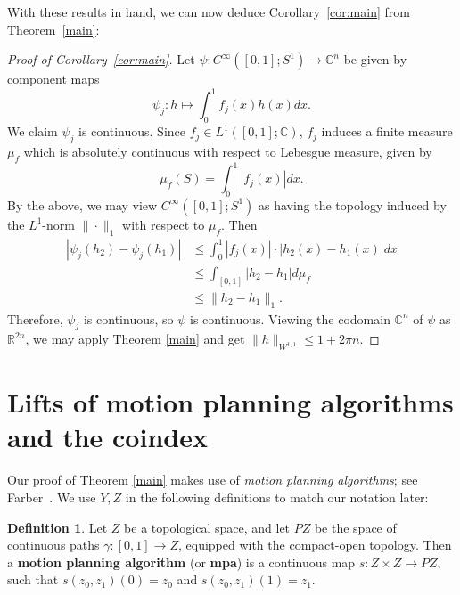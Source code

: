 \documentclass[11pt, reqno, english]{amsart}
\theoremstyle{plain}
\theoremstyle{definition}
\newtheorem{definition}[theorem]{Definition}
\newcommand{\R}{\mathbb{R}}
\newcommand{\C}{\mathbb{C}}
\begin{document}
With these results in hand, we can now deduce Corollary~\ref{cor:main} from Theorem~\ref{main}:

\begin{proof}[Proof of Corollary~\ref{cor:main}]
  Let $\psi\colon C^{\infty}([0, 1]; S^{1}) \rightarrow \C^{n}$ be given by
  component maps $$\psi_{j}\colon h \mapsto \int_{0}^{1}f_{j}(x)h(x)dx.$$ We
  claim $\psi_{j}$ is continuous. Since $f_{j} \in L^{1}([0, 1]; \C)$, $f_{j}$
  induces a finite measure $\mu_{f}$ which is absolutely continuous with
  respect to Lebesgue measure, given by
  $$\mu_{f}(S) = \int_{0}^{1}|f_{j}(x)|dx.$$
  By the above, we may view $C^{\infty}([0, 1]; S^{1})$ as having the topology
  induced by the $L^{1}$-norm $\|\cdot\|_{1}$ with respect to $\mu_{f}$. Then
  \begin{align*}
    |\psi_{j}(h_{2}) - \psi_{j}(h_{1})| &\le \int_{0}^{1}|f_{j}(x)|\cdot
    |h_{2}(x) - h_{1}(x)|dx\\
    &\le \int_{[0, 1]}|h_{2} - h_{1}|d\mu_{f}\\
    &\le \|h_{2} - h_{1}\|_{1}.
  \end{align*}
  Therefore, $\psi_{j}$ is continuous, so $\psi$ is continuous. Viewing the
  codomain $\C^{n}$ of $\psi$ as $\R^{2n}$, we may apply Theorem \ref{main} and
  get $\|h\|_{W^{1, 1}} \le 1 + 2 \pi n$.
\end{proof}













\section{Lifts of motion planning algorithms and the coindex}
\label{sec:mpa}

Our proof of Theorem \ref{main} makes use of \emph{motion planning algorithms}; see Farber~\cite{farber2003}.
We use $Y, Z$ in the following definitions to match our notation later:

\begin{definition}
  Let $Z$ be a topological space, and let $PZ$ be the space of continuous paths
  $\gamma\colon [0, 1] \rightarrow Z$, equipped with the compact-open topology.
  Then a \textbf{motion planning algorithm} (or \textbf{mpa}) is a continuous
  map $s\colon Z \times Z \rightarrow PZ$, such that $s(z_{0}, z_{1})(0) =
  z_{0}$ and $s(z_{0}, z_{1})(1) = z_{1}$.
\end{definition}
\end{document}
